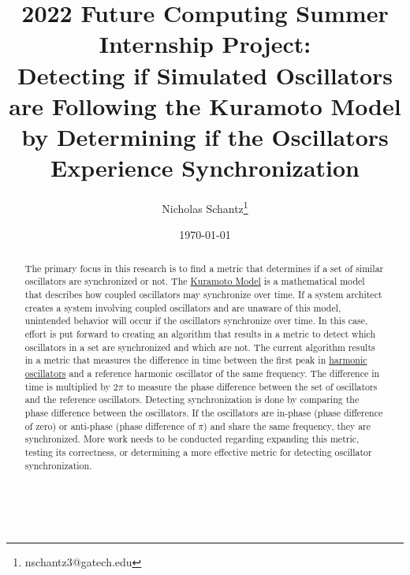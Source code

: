 \documentclass{article}
\begin{document}
        \title{2022 Future Computing Summer Internship Project:\\Detecting if Simulated Oscillators are Following the Kuramoto Model by Determining if the Oscillators Experience Synchronization}
        \author{Nicholas Schantz\thanks{nschantz3@gatech.edu}}
        \date{\today}
            \maketitle
        \begin{abstract}
        	The primary focus in this research is to find a metric that determines if a set of similar oscillators are synchronized or not. The \href{https://en.wikipedia.org/wiki/Kuramoto_model}{Kuramoto Model} is a mathematical model that describes how coupled oscillators may synchronize over time. If a system architect creates a system involving coupled oscillators and are unaware of this model, unintended behavior will occur if the oscillators synchronize over time. In this case, effort is put forward to creating an algorithm that results in a metric to detect which oscillators in a set are synchronized and which are not. The current algorithm results in a metric that measures the difference in time between the first peak in \href{https://en.wikipedia.org/wiki/Electronic_oscillator#Harmonic_oscillators}{harmonic oscillators} and a reference harmonic oscillator of the same frequency. The difference in time is multiplied by 2$\pi$ to measure the phase difference between the set of oscillators and the reference oscillators. Detecting synchronization is done by comparing the phase difference between the oscillators. If the oscillators are in-phase (phase difference of zero) or anti-phase (phase difference of $\pi$) and share the same frequency, they are synchronized. More work needs to be conducted regarding expanding this metric, testing its correctness, or determining a more effective metric for detecting oscillator synchronization.

        \end{abstract}

\ \\


\end{document}
